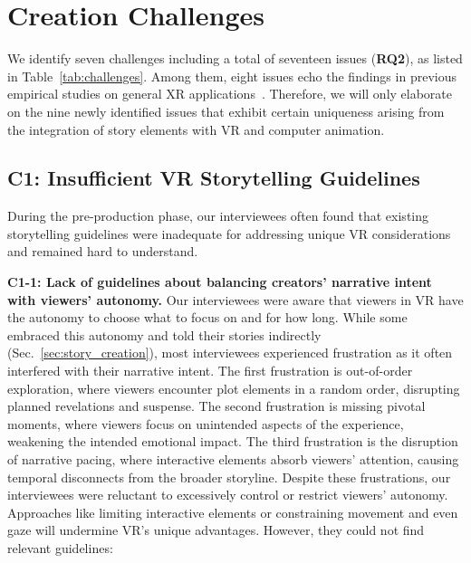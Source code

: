 \section{Creation Challenges}
\label{sec:challenges}

We identify seven challenges including a total of seventeen issues (\textbf{RQ2}), as listed in Table~\ref{tab:challenges}. Among them, eight issues echo the findings in previous empirical studies on general XR applications~\cite{krauss2021current, ashtari2020creating, krauss2022elements, liu2023challenges}. Therefore, we will only elaborate on the nine newly identified issues that exhibit certain uniqueness arising from the integration of story elements with VR and computer animation.




\subsection{C1: Insufficient VR Storytelling Guidelines}
\label{sec:challenge_guideline}

During the pre-production phase, our interviewees often found that existing storytelling guidelines were inadequate for addressing unique VR considerations and remained hard to understand.

\textbf{C1-1: Lack of guidelines about balancing creators' narrative intent with viewers' autonomy.}
Our interviewees were aware that viewers in VR have the autonomy to choose what to focus on and for how long. While some embraced this autonomy and told their stories indirectly (Sec.~\ref{sec:story_creation}), most interviewees experienced frustration as it often interfered with their narrative intent.
The first frustration is out-of-order exploration, where viewers encounter plot elements in a random order, disrupting planned revelations and suspense.
The second frustration is missing pivotal moments, where viewers focus on unintended aspects of the experience, weakening the intended emotional impact.
The third frustration is the disruption of narrative pacing, where interactive elements absorb viewers’ attention, causing temporal disconnects from the broader storyline.
Despite these frustrations, our interviewees were reluctant to excessively control or restrict viewers' autonomy. Approaches like limiting interactive elements or constraining movement and even gaze will undermine VR's unique advantages. However, they could not find relevant guidelines:


